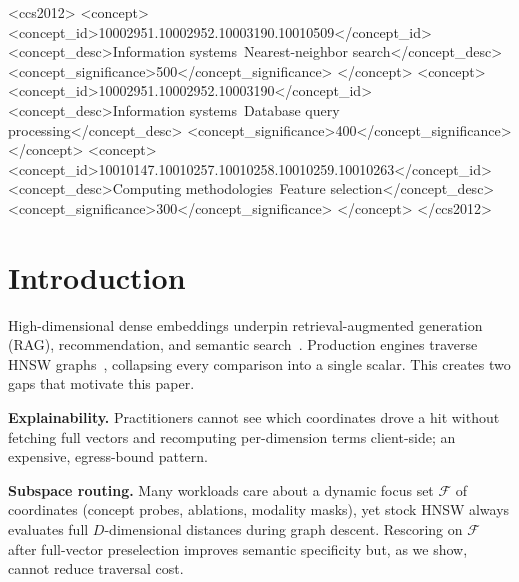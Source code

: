 \documentclass[sigconf,review,balance=false]{acmart}
\begin{document}
\begin{CCSXML}
<ccs2012>
   <concept>
       <concept_id>10002951.10002952.10003190.10010509</concept_id>
       <concept_desc>Information systems~Nearest-neighbor search</concept_desc>
       <concept_significance>500</concept_significance>
   </concept>
   <concept>
       <concept_id>10002951.10002952.10003190</concept_id>
       <concept_desc>Information systems~Database query processing</concept_desc>
       <concept_significance>400</concept_significance>
   </concept>
   <concept>
       <concept_id>10010147.10010257.10010258.10010259.10010263</concept_id>
       <concept_desc>Computing methodologies~Feature selection</concept_desc>
       <concept_significance>300</concept_significance>
   </concept>
</ccs2012>
\end{CCSXML}



\maketitle

\section{Introduction}
\label{sec:intro}

High-dimensional dense embeddings underpin retrieval-augmented generation
(RAG), recommendation, and semantic search~\cite{lewis2020rag,qdrant2024,wang2021milvus}.
Production engines traverse HNSW graphs~\cite{malkov2018hnsw}, collapsing every
comparison into a single scalar. This creates two gaps that motivate this paper.

\textbf{Explainability.} Practitioners cannot see which coordinates drove a hit
without fetching full vectors and recomputing per-dimension terms client-side;
an expensive, egress-bound pattern.

\textbf{Subspace routing.} Many workloads care about a dynamic focus set
$\mathcal{F}$ of coordinates (concept probes, ablations, modality masks), yet
stock HNSW always evaluates full $D$-dimensional distances during graph descent.
Rescoring on $\mathcal{F}$ after full-vector preselection improves semantic
specificity but, as we show, cannot reduce traversal cost.
\end{document}
